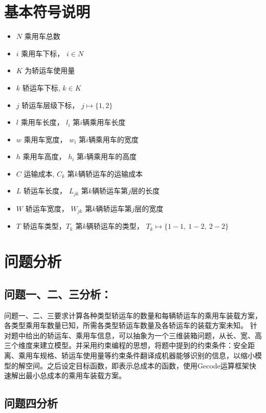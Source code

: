 \documentclass[UTF8]{ctexart}
\begin{document}
\section{基本符号说明}
	\begin{itemize}
		\item $N$ 乘用车总数
		\item $i$ 乘用车下标， $i \in N$
		\item $K$ 为轿运车使用量
		\item $k$ 轿运车下标,  $k \in K$
		\item $j$ 轿运车层级下标， $j \mapsto \{1,2\}$
		\item $l$ 乘用车长度， $l_i$ 第$i$辆乘用车长度
		\item $w$ 乘用车宽度， $w_i$ 第$i$辆乘用车的宽度
		\item $h$ 乘用车高度， $h_i$ 第$i$辆乘用车的高度
		\item $C$ 运输成本, $C_k$ 第$k$辆轿运车的运输成本
		\item $L$ 轿运车长度， $L_{jk}$ 第$k$辆轿运车第$j$层的长度
		\item $W$ 轿运车宽度， $W_{jk}$ 第$k$辆轿运车第$j$层的宽度
		\item $T$ 轿运车类型，$T_k$ 第$k$辆轿运车的类型， $T_k \mapsto \{1-1, ~1-2, ~2-2 \}$
		
	\end{itemize}


\section{问题分析}
\subsection{问题一、二、三分析：}
问题一、二、三要求计算各种类型轿运车的数量和每辆轿运车的乘用车装载方案，各类型乘用车数量已知，所需各类型轿运车数量及各轿运车的装载方案未知。
针对题中给出的轿运车、乘用车信息，可以抽象为一个三维装箱问题，从长、宽、高三个维度来建立模型。并采用约束编程的思想，将题中提到的约束条件：安全距离、乘用车规格、轿运车使用量等约束条件翻译成机器能够识别的信息，以缩小模型的解空间。之后设定目标函数，即表示总成本的函数，使用Gecode运算框架快速解出最小总成本的乘用车装载方案。

\subsubsubsection{}



\subsection{问题四分析}
\end{document}

